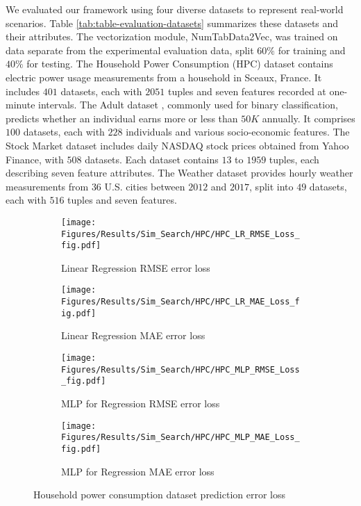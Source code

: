 We evaluated our framework using four diverse datasets to represent real-world scenarios. Table \ref{tab:table-evaluation-datasets} summarizes these datasets and their attributes. The vectorization module, NumTabData2Vec, was trained on data separate from the experimental evaluation data, split $60\%$ for training and $40\%$ for testing.
The Household Power Consumption (HPC) dataset \cite{b21HPCdataset} contains electric power usage measurements from a household in Sceaux, France. It includes $401$ datasets, each with $2051$ tuples and seven features recorded at one-minute intervals. The Adult dataset \cite{b22AdultDataset}, commonly used for binary classification, predicts whether an individual earns more or less than $50K$ annually. It comprises $100$ datasets, each with $228$ individuals and various socio-economic features.
The Stock Market dataset \cite{b23StockMarketDataset} includes daily NASDAQ stock prices obtained from Yahoo Finance, with $508$ datasets. Each dataset contains $13$ to $1959$ tuples, each describing seven feature attributes. The Weather dataset \cite{b23WeatherDataset} provides hourly weather measurements from $36$ U.S. cities between $2012$ and $2017$, split into $49$ datasets, each with $516$ tuples and seven features.


\begin{figure}[!t]
     \centering
     \begin{subfigure}[b]{0.24\textwidth}
         \centering
         \texttt{[image: Figures/Results/Sim\_Search/HPC/HPC\_LR\_RMSE\_Loss\_fig.pdf]}
         \caption{Linear Regression RMSE error loss}
         \label{fig:HPC-LR-RMSE}
     \end{subfigure}
     \hfill 
     \begin{subfigure}[b]{0.24\textwidth}
         \centering
         \texttt{[image: Figures/Results/Sim\_Search/HPC/HPC\_LR\_MAE\_Loss\_fig.pdf]}
         \caption{Linear Regression MAE error loss}
         \label{fig:HPC-LR-MAE}
     \end{subfigure}
        
     \begin{subfigure}[b]{0.24\textwidth}
         \centering
         \texttt{[image: Figures/Results/Sim\_Search/HPC/HPC\_MLP\_RMSE\_Loss\_fig.pdf]}
         \caption{MLP for Regression RMSE error loss}
         \label{fig:HPC-MLP-RMSE}
     \end{subfigure}
     \hfill 
     \begin{subfigure}[b]{0.24\textwidth}
         \centering
         \texttt{[image: Figures/Results/Sim\_Search/HPC/HPC\_MLP\_MAE\_Loss\_fig.pdf]}
         \caption{MLP for Regression MAE error loss}
         \label{fig:HPC-MLP-MAE}
     \end{subfigure}
        \caption{Household power consumption dataset prediction error loss}
        \label{fig:HPC-EVAL-RES}
\end{figure}


